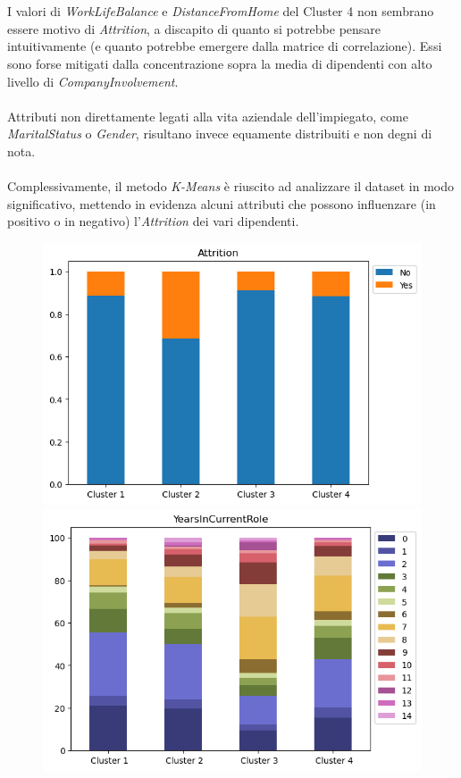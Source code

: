 \\\\
I valori di \textit{WorkLifeBalance} e \textit{DistanceFromHome} del Cluster 4 non sembrano essere motivo di \textit{Attrition}, a discapito di quanto si potrebbe pensare intuitivamente (e quanto potrebbe emergere dalla matrice di correlazione). Essi sono forse mitigati dalla concentrazione sopra la media di dipendenti con alto livello di \textit{CompanyInvolvement}.
\\\\
Attributi non direttamente legati alla vita aziendale dell’impiegato, come \textit{MaritalStatus} o \textit{Gender}, risultano invece equamente distribuiti e non degni di nota.
\\\\
Complessivamente, il metodo \textit{K-Means} è riuscito ad analizzare il dataset in modo significativo, mettendo in evidenza alcuni attributi che possono influenzare (in positivo o in negativo) l’\textit{Attrition} dei vari dipendenti.
\begin{figure}[H]
	\centering
	\subfloat 
	{
		\includegraphics[width=.45\textwidth]{Immagini/KMeansAttr.png}
		\label{kmeansAttrition}
	}
	\quad
	\subfloat
	{
		\includegraphics[width=.45\textwidth]{Immagini/KMeansYears.png}
		\label{kmeansYears}
    }
	\label{Cluster}
\end{figure}
